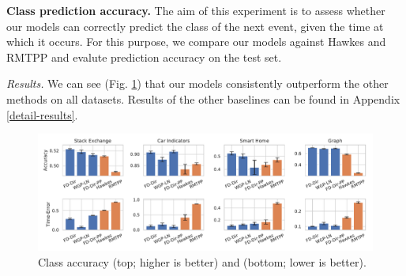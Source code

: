 \vspace{3mm}
\textbf{Class prediction accuracy.} The aim of this experiment is to assess whether our models can correctly predict the class of the next event, given the time at which it occurs. For this purpose, we compare our models against Hawkes and RMTPP and evalute prediction accuracy on the test set.

\textit{Results.} We can see (Fig. \ref{fig:accuracy}) that our models consistently outperform the other methods on all datasets. Results of the other baselines can be found in Appendix \ref{detail-results}.


\begin{figure}
\centering
    \includegraphics[width=\linewidth]{images/accuracy-final.pdf}
    \vspace*{-0.7cm}
    \caption{Class accuracy (top; higher is better) and \TimeScore (bottom; lower is better).}
    \label{fig:accuracy}
    \vspace*{-0.3cm}
\end{figure}
